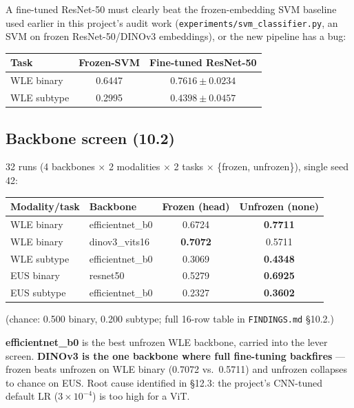 \documentclass[10pt]{article}
\begin{document}
A fine-tuned ResNet-50 must clearly beat the frozen-embedding SVM baseline used earlier in this project's
audit work (\texttt{experiments/svm\_classifier.py}, an SVM on frozen ResNet-50/DINOv3 embeddings), or the
new pipeline has a bug:

\begin{center}
\begin{tabular}{lcc}
\toprule
Task & Frozen-SVM & Fine-tuned ResNet-50 \\
\midrule
WLE binary & 0.6447 & $\mathbf{0.7616\pm0.0234}$ \\
WLE subtype & 0.2995 & $\mathbf{0.4398\pm0.0457}$ \\
\bottomrule
\end{tabular}
\end{center}

\subsection{Backbone screen (10.2)}

32 runs (4 backbones $\times$ 2 modalities $\times$ 2 tasks $\times$ \{frozen, unfrozen\}), single seed 42:

\begin{center}
\begin{tabular}{llcc}
\toprule
Modality/task & Backbone & Frozen (head) & Unfrozen (none) \\
\midrule
WLE binary & efficientnet\_b0 & 0.6724 & \textbf{0.7711} \\
WLE binary & dinov3\_vits16 & \textbf{0.7072} & 0.5711 \\
WLE subtype & efficientnet\_b0 & 0.3069 & \textbf{0.4348} \\
EUS binary & resnet50 & 0.5279 & \textbf{0.6925} \\
EUS subtype & efficientnet\_b0 & 0.2327 & \textbf{0.3602} \\
\bottomrule
\end{tabular}
\end{center}
(chance: 0.500 binary, 0.200 subtype; full 16-row table in \texttt{FINDINGS.md} \S10.2.)

\textbf{efficientnet\_b0} is the best unfrozen WLE backbone, carried into the lever screen.
\textbf{DINOv3 is the one backbone where full fine-tuning backfires} --- frozen beats unfrozen on WLE
binary (0.7072 vs.\ 0.5711) and unfrozen collapses to chance on EUS. Root cause identified in \S12.3: the
project's CNN-tuned default LR ($3\times10^{-4}$) is too high for a ViT.
\end{document}

